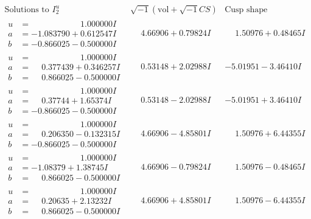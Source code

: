 \documentclass[1p]{elsarticle_modified}
\theoremstyle{definition}
\newcommand{\I}{\sqrt{-1}}
\begin{document}
$$\begin{array}{c|c|c}  
\text{Solutions to }I^u_{2}& \I (\text{vol} + \sqrt{-1}CS) & \text{Cusp shape}\\
 \hline 
\begin{aligned}
u &= \phantom{-0.000000 -}1.000000 I \\
a &= -1.083790 + 0.612547 I \\
b &= -0.866025 - 0.500000 I\end{aligned}
 & \phantom{-}4.66906 + 0.79824 I & \phantom{-}1.50976 + 0.48465 I \\ \hline\begin{aligned}
u &= \phantom{-0.000000 -}1.000000 I \\
a &= \phantom{-}0.377439 + 0.346257 I \\
b &= \phantom{-}0.866025 - 0.500000 I\end{aligned}
 & \phantom{-}0.53148 + 2.02988 I & -5.01951 - 3.46410 I \\ \hline\begin{aligned}
u &= \phantom{-0.000000 -}1.000000 I \\
a &= \phantom{-}0.37744 + 1.65374 I \\
b &= -0.866025 - 0.500000 I\end{aligned}
 & \phantom{-}0.53148 - 2.02988 I & -5.01951 + 3.46410 I \\ \hline\begin{aligned}
u &= \phantom{-0.000000 -}1.000000 I \\
a &= \phantom{-}0.206350 - 0.132315 I \\
b &= -0.866025 - 0.500000 I\end{aligned}
 & \phantom{-}4.66906 - 4.85801 I & \phantom{-}1.50976 + 6.44355 I \\ \hline\begin{aligned}
u &= \phantom{-0.000000 -}1.000000 I \\
a &= -1.08379 + 1.38745 I \\
b &= \phantom{-}0.866025 - 0.500000 I\end{aligned}
 & \phantom{-}4.66906 - 0.79824 I & \phantom{-}1.50976 - 0.48465 I \\ \hline\begin{aligned}
u &= \phantom{-0.000000 -}1.000000 I \\
a &= \phantom{-}0.20635 + 2.13232 I \\
b &= \phantom{-}0.866025 - 0.500000 I\end{aligned}
 & \phantom{-}4.66906 + 4.85801 I & \phantom{-}1.50976 - 6.44355 I \\ \hline\begin{aligned}

\end{aligned}
\end{array}$$
\end{document}
